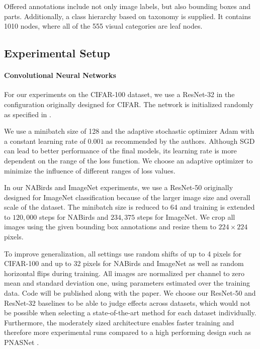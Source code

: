 \documentclass[10pt,twocolumn,letterpaper]{article}
\begin{document}
Offered annotations include not only image labels, but also bounding boxes and parts.
Additionally, a class hierarchy based on taxonomy is supplied. 
It contains 1010 nodes, where all of the 555 visual categories are leaf nodes.

\subsection{Experimental Setup}
\paragraph{Convolutional Neural Networks}
\label{sec:expsetup}
For our experiments on the CIFAR-100 dataset, we use a ResNet-32 \cite{He2015Res}
in the configuration originally designed for CIFAR. The network is initialized randomly as specified
in \cite{He2015Res}.

We use a minibatch size of 128 and the adaptive stochastic optimizer Adam \cite{Kingma2014Adam} with a
constant learning rate of $0.001$ as recommended by the authors. Although SGD can lead to better
performance of the final models, its learning rate is more dependent on the range of the loss function.
We choose an adaptive optimizer to minimize the influence of different ranges of loss values.

In our NABirds and ImageNet experiments, we use a ResNet-50 \cite{He2015Res,He2016Identity}
originally designed for ImageNet classification because of the larger image size and overall scale of the dataset.
The minibatch size is reduced to 64 and training is extended to $120,000$ steps for NABirds and $234,375$ steps for ImageNet.
We crop all images using the given bounding box annotations and resize them to $224\times 224$ pixels.

To improve generalization, all settings use random shifts of up to 4 pixels for CIFAR-100 and
up to 32 pixels for NABirds and ImageNet as well as random horizontal flips during training. All images
are normalized per channel to zero mean and standard deviation one, using parameters estimated over the
training data. Code will be published along with the paper.
We choose our ResNet-50 and ResNet-32 baselines to be able to judge effects across datasets, which would not be possible
when selecting a state-of-the-art method for each dataset individually. Furthermore, the moderately sized
architecture enables faster training and therefore more experimental runs compared to a high performing
design such as PNASNet \cite{Liu2017PNASNet}.
\end{document}
